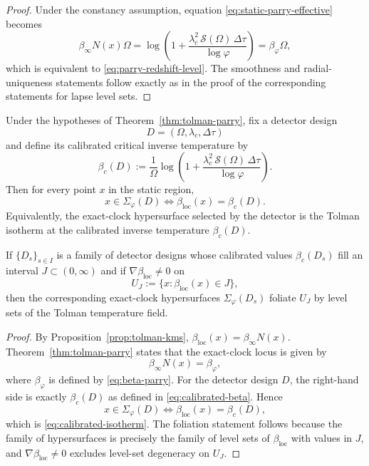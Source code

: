 \begin{proof}
Under the constancy assumption, equation \eqref{eq:static-parry-effective} becomes
\[
\beta_\infty N(x)\Omega
=
\log\!\left(
1+\frac{\lambda_c^2\,\mathcal S(\Omega)\,\Delta\tau}{\log\varphi}
\right)
=
\beta_\varphi\Omega,
\]
which is equivalent to \eqref{eq:parry-redshift-level}. The smoothness and radial-uniqueness statements follow exactly as in the proof of the corresponding statements for lapse level sets.
\end{proof}

\begin{theorem}\label{thm:calibrated-thermometry}
Under the hypotheses of Theorem~\ref{thm:tolman-parry}, fix a detector design
\[
D=(\Omega,\lambda_c,\Delta\tau)
\]
and define its calibrated critical inverse temperature by
\begin{equation}\label{eq:calibrated-beta}
\beta_c(D)
:=
\frac{1}{\Omega}
\log\!\left(
1+\frac{\lambda_c^2\,\mathcal S(\Omega)\,\Delta\tau}{\log\varphi}
\right).
\end{equation}
Then for every point $x$ in the static region,
\begin{equation}\label{eq:calibrated-isotherm}
x\in\Sigma_\varphi(D)
\iff
\beta_{\mathrm{loc}}(x)=\beta_c(D).
\end{equation}
Equivalently, the exact-clock hypersurface selected by the detector is the Tolman isotherm at the calibrated inverse temperature $\beta_c(D)$.

If $\{D_s\}_{s\in I}$ is a family of detector designs whose calibrated values $\beta_c(D_s)$ fill an interval $J\subset(0,\infty)$ and if $\nabla\beta_{\mathrm{loc}}\neq 0$ on
\[
U_J:=\{x:\beta_{\mathrm{loc}}(x)\in J\},
\]
then the corresponding exact-clock hypersurfaces $\Sigma_\varphi(D_s)$ foliate $U_J$ by level sets of the Tolman temperature field.
\end{theorem}

\begin{proof}
By Proposition~\ref{prop:tolman-kms}, $\beta_{\mathrm{loc}}(x)=\beta_\infty N(x)$. Theorem~\ref{thm:tolman-parry} states that the exact-clock locus is given by
\[
\beta_\infty N(x)=\beta_\varphi,
\]
where $\beta_\varphi$ is defined by \eqref{eq:beta-parry}. For the detector design $D$, the right-hand side is exactly $\beta_c(D)$ as defined in \eqref{eq:calibrated-beta}. Hence
\[
x\in\Sigma_\varphi(D)
\iff
\beta_{\mathrm{loc}}(x)=\beta_c(D),
\]
which is \eqref{eq:calibrated-isotherm}. The foliation statement follows because the family of hypersurfaces is precisely the family of level sets of $\beta_{\mathrm{loc}}$ with values in $J$, and $\nabla\beta_{\mathrm{loc}}\neq 0$ excludes level-set degeneracy on $U_J$.
\end{proof}

